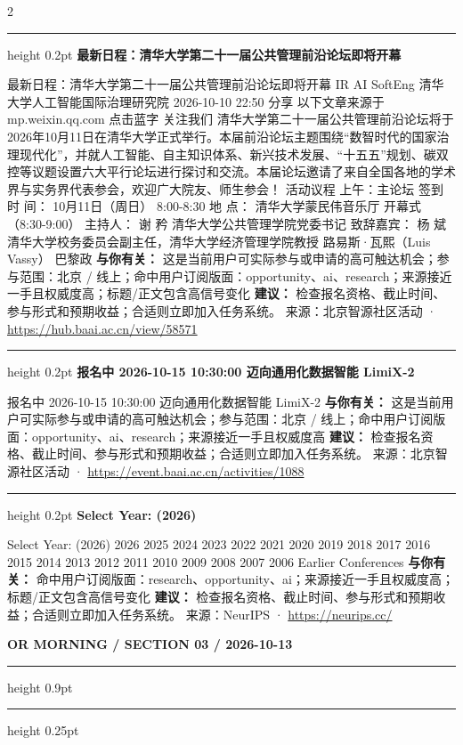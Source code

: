 \documentclass[10.5pt]{ctexart}
\begin{document}
\begin{multicols}{2}
\vspace{2mm}
\hrule height 0.2pt
\vspace{2mm}
{\large\bfseries 最新日程：清华大学第二十一届公共管理前沿论坛即将开幕}\par
最新日程：清华大学第二十一届公共管理前沿论坛即将开幕 IR AI SoftEng 清华大学人工智能国际治理研究院 2026-10-10 22:50 分享 以下文章来源于mp.weixin.qq.com 点击蓝字 关注我们 清华大学第二十一届公共管理前沿论坛将于2026年10月11日在清华大学正式举行。本届前沿论坛主题围绕“数智时代的国家治理现代化”，并就人工智能、自主知识体系、新兴技术发展、“十五五”规划、碳双控等议题设置六大平行论坛进行探讨和交流。本届论坛邀请了来自全国各地的学术界与实务界代表参会，欢迎广大院友、师生参会！ 活动议程 上午：主论坛 签到 时 间： 10月11日（周日） 8:00-8:30 地 点： 清华大学蒙民伟音乐厅 开幕式（8:30-9:00） 主持人： 谢 矜 清华大学公共管理学院党委书记 致辞嘉宾： 杨 斌 清华大学校务委员会副主任，清华大学经济管理学院教授 路易斯·瓦熙（Luis Vassy） 巴黎政
\textbf{与你有关：} 这是当前用户可实际参与或申请的高可触达机会；参与范围：北京 / 线上；命中用户订阅版面：opportunity、ai、research；来源接近一手且权威度高；标题/正文包含高信号变化
\textbf{建议：} 检查报名资格、截止时间、参与形式和预期收益；合适则立即加入任务系统。
{\footnotesize\color{ormuted} 来源：北京智源社区活动 · \url{https://hub.baai.ac.cn/view/58571}}
\vspace{2mm}
\hrule height 0.2pt
\vspace{2mm}
{\large\bfseries 报名中 2026-10-15 10:30:00 迈向通用化数据智能 LimiX-2}\par
报名中 2026-10-15 10:30:00 迈向通用化数据智能 LimiX-2
\textbf{与你有关：} 这是当前用户可实际参与或申请的高可触达机会；参与范围：北京 / 线上；命中用户订阅版面：opportunity、ai、research；来源接近一手且权威度高
\textbf{建议：} 检查报名资格、截止时间、参与形式和预期收益；合适则立即加入任务系统。
{\footnotesize\color{ormuted} 来源：北京智源社区活动 · \url{https://event.baai.ac.cn/activities/1088}}
\vspace{2mm}
\hrule height 0.2pt
\vspace{2mm}
{\large\bfseries Select Year: (2026)}\par
Select Year: (2026) 2026 2025 2024 2023 2022 2021 2020 2019 2018 2017 2016 2015 2014 2013 2012 2011 2010 2009 2008 2007 2006 Earlier Conferences
\textbf{与你有关：} 命中用户订阅版面：research、opportunity、ai；来源接近一手且权威度高；标题/正文包含高信号变化
\textbf{建议：} 检查报名资格、截止时间、参与形式和预期收益；合适则立即加入任务系统。
{\footnotesize\color{ormuted} 来源：NeurIPS · \url{https://neurips.cc/}}
\end{multicols}
\newpage
{\small\bfseries OR MORNING / SECTION 03 / 2026-10-13}
\vspace{2mm}
\hrule height 0.9pt
\vspace{1.5mm}
\hrule height 0.25pt
\vspace{4mm}
\end{document}

